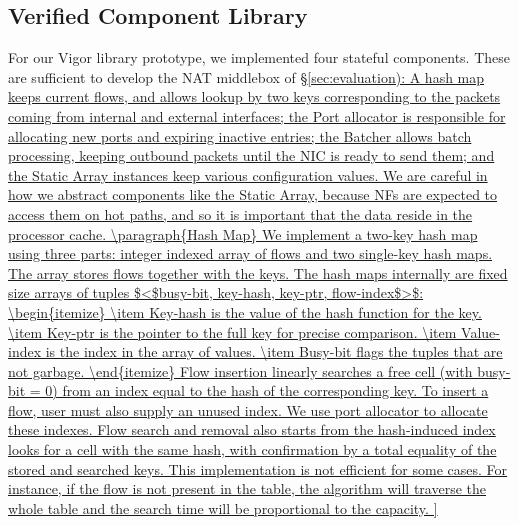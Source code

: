 \documentclass[letterpaper,twocolumn,10pt]{article}
\begin{document}
\subsection{Verified Component Library}

For our Vigor library prototype, we implemented four stateful components. These are sufficient to develop the NAT middlebox of \S\ref{sec:evaluation): A hash map keeps current flows, and allows lookup by two keys corresponding to the packets coming from internal and external interfaces; the Port allocator is responsible for allocating new ports and expiring inactive entries; the Batcher allows batch processing, keeping outbound packets until the NIC is ready to send them; and the Static Array instances keep various configuration values. We are careful in how we abstract components like the Static Array, because NFs are expected to access them on hot paths, and so it is important that the data reside in the processor cache.

\paragraph{Hash Map}

We implement a two-key hash map using three parts: integer indexed array of flows and two single-key hash maps. The array stores flows together with the keys. The hash maps internally are fixed size arrays of tuples $<$busy-bit, key-hash, key-ptr, flow-index$>$:
\begin{itemize}
    \item Key-hash is the value of the hash function for the key.
    \item Key-ptr is the pointer to the full key for precise comparison.
    \item Value-index is the index in the array of values.
    \item Busy-bit flags the tuples that are not garbage.
\end{itemize}


Flow insertion linearly searches a free cell (with busy-bit = 0) from an index equal to the hash of the corresponding key. To insert a flow, user must also supply an unused index. We use port allocator to allocate these indexes.

Flow search and removal also starts from the hash-induced index looks for a cell with the same hash, with confirmation by a total equality of the stored and searched keys.

This implementation is not efficient for some cases. For instance, if the flow is not present in the table, the algorithm will traverse the whole table and the search time will be proportional to the capacity.

}
\end{document}
